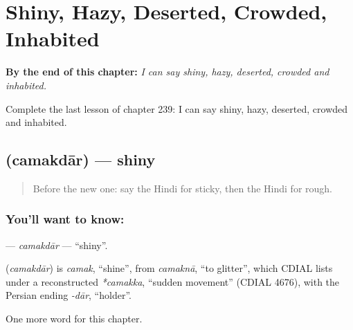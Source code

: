 
\chapter{Shiny, Hazy, Deserted, Crowded, Inhabited}
\label{ch:hi-shiny-hazy-deserted-crowded-inhabited}

\begin{chapteropening}
\textbf{By the end of this chapter:} \emph{I can say shiny, hazy, deserted, crowded and inhabited.}

Complete the last lesson of chapter 239: I can say shiny, hazy, deserted, crowded and inhabited.
\end{chapteropening}

\section[\texorpdfstring{\hi{चमकदार} (camakdār)}{चमकदार (camakdār)}]{ (camakdār) — shiny}

\label{lesson:HI-C239-camakdar}



\begin{quote}
Before the new one: say the Hindi for sticky, then the Hindi for rough.
\end{quote}

\subsection*{You'll want to know: }
\textbf{} — \emph{camakdār} — \textquotedblleft{}shiny\textquotedblright{}.

\begin{cousinweb}
\textbf{} (\emph{camakdār}) is \emph{camak}, \textquotedblleft{}shine\textquotedblright{}, from \emph{camaknā}, \textquotedblleft{}to glitter\textquotedblright{}, which CDIAL lists under a reconstructed \emph{*camakka}, \textquotedblleft{}sudden movement\textquotedblright{} (CDIAL 4676), with the Persian ending \emph{-dār}, \textquotedblleft{}holder\textquotedblright{}.
\end{cousinweb}

\begin{grammarlens}[title={What you've built}]
One more word for this chapter.
\end{grammarlens}

